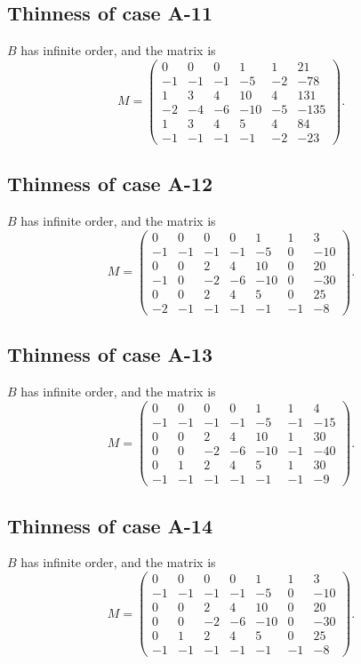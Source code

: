 \documentclass[11pt,a4paper]{amsart}
\theoremstyle{definition}
\theoremstyle{definition}
\numberwithin{equation}{section}
\begin{document}
\subsection{Thinness of case A-11}
$B$ has infinite order, and the matrix is
$$M=\left(\begin{array}{rrrrrr}
0 & 0 & 0 & 1 & 1 & 21 \\
-1 & -1 & -1 & -5 & -2 & -78 \\
1 & 3 & 4 & 10 & 4 & 131 \\
-2 & -4 & -6 & -10 & -5 & -135 \\
1 & 3 & 4 & 5 & 4 & 84 \\
-1 & -1 & -1 & -1 & -2 & -23
\end{array}\right).
$$

\subsection{Thinness of case A-12}
$B$ has infinite order, and the matrix is
$$M=\left(\begin{array}{rrrrrrr}
0 & 0 & 0 & 0 & 1 & 1 & 3 \\
-1 & -1 & -1 & -1 & -5 & 0 & -10 \\
0 & 0 & 2 & 4 & 10 & 0 & 20 \\
-1 & 0 & -2 & -6 & -10 & 0 & -30 \\
0 & 0 & 2 & 4 & 5 & 0 & 25 \\
-2 & -1 & -1 & -1 & -1 & -1 & -8
\end{array}\right).
$$

\subsection{Thinness of case A-13}
$B$ has infinite order, and the matrix is
$$M=\left(\begin{array}{rrrrrrr}
0 & 0 & 0 & 0 & 1 & 1 & 4 \\
-1 & -1 & -1 & -1 & -5 & -1 & -15 \\
0 & 0 & 2 & 4 & 10 & 1 & 30 \\
0 & 0 & -2 & -6 & -10 & -1 & -40 \\
0 & 1 & 2 & 4 & 5 & 1 & 30 \\
-1 & -1 & -1 & -1 & -1 & -1 & -9
\end{array}\right).
$$

\subsection{Thinness of case A-14}
$B$ has infinite order, and the matrix is
$$M=\left(\begin{array}{rrrrrrr}
0 & 0 & 0 & 0 & 1 & 1 & 3 \\
-1 & -1 & -1 & -1 & -5 & 0 & -10 \\
0 & 0 & 2 & 4 & 10 & 0 & 20 \\
0 & 0 & -2 & -6 & -10 & 0 & -30 \\
0 & 1 & 2 & 4 & 5 & 0 & 25 \\
-1 & -1 & -1 & -1 & -1 & -1 & -8
\end{array}\right).
$$
\end{document}
